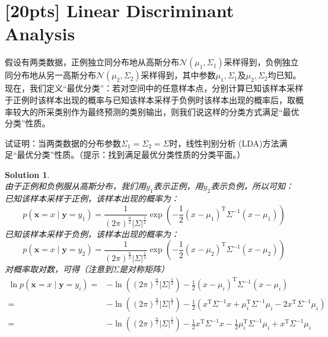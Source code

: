 \documentclass[a4paper,UTF8]{article}
\numberwithin{equation}{section}
\newtheorem*{solution}{Solution}
\begin{document}
\section{[20pts] Linear Discriminant Analysis}
假设有两类数据，正例独立同分布地从高斯分布$\mathcal{N}(\mu_1,\Sigma_1)$采样得到，负例独立同分布地从另一高斯分布$\mathcal{N}(\mu_2,\Sigma_2)$采样得到，其中参数$\mu_1,\Sigma_1$及$\mu_2,\Sigma_2$均已知。现在，我们定义“最优分类”：若对空间中的任意样本点，分别计算已知该样本采样于正例时该样本出现的概率与已知该样本采样于负例时该样本出现的概率后，取概率较大的所采类别作为最终预测的类别输出，则我们说这样的分类方式满足“最优分类”性质。

试证明：当两类数据的分布参数$\Sigma_1=\Sigma_2=\Sigma$时，线性判别分析 (LDA)方法满足“最优分类”性质。（提示：找到满足最优分类性质的分类平面。）
\begin{solution}
~\\
由于正例和负例服从高斯分布，我们用$y_1$表示正例，用$y_2$表示负例，所以可知：\\
已知该样本采样于正例，该样本出现的概率为：\\
\begin{equation}
p(\mathbf{x} = x \mid \mathbf{y} = y_1) = \frac{1}{(2\pi)^{\frac{n}{2}}\lvert \Sigma \rvert^{\frac{1}{2}}}\exp(-\frac{1}{2}(x - \mu_1)^\mathrm{T}\Sigma^{-1}(x - \mu_1)
)
\end{equation}
已知该样本采样于负例，该样本出现的概率为：\\
\begin{equation}
p(\mathbf{x} = x \mid \mathbf{y} = y_2) = \frac{1}{(2\pi)^{\frac{n}{2}}\lvert \Sigma \rvert^{\frac{1}{2}}}\exp(-\frac{1}{2}(x - \mu_2)^\mathrm{T}\Sigma^{-1}(x - \mu_2)
)
\end{equation}
对概率取对数，可得（注意到$\Sigma$是对称矩阵）
\begin{equation}
\begin{aligned}
\ln p(\mathbf{x} = x \mid \mathbf{y} = y_i) 
=&- \ln((2\pi)^{\frac{n}{2}}\lvert \Sigma \rvert^{\frac{1}{2}}) - \frac{1}{2}(x - \mu_i)^\mathrm{T}\Sigma^{-1}(x - \mu_i)\\
=&- \ln((2\pi)^{\frac{n}{2}}\lvert \Sigma \rvert^{\frac{1}{2}}) - \frac{1}{2}(x^\mathrm{T}\Sigma^{-1}x + \mu_i^\mathrm{T}\Sigma^{-1}\mu_i - 2x^{\mathrm{T}}\Sigma^{-1}\mu_i)\\
=&- \ln((2\pi)^{\frac{n}{2}}\lvert \Sigma \rvert^{\frac{1}{2}}) - \frac{1}{2}x^\mathrm{T}\Sigma^{-1}x - \frac{1}{2} \mu_i^\mathrm{T}\Sigma^{-1}\mu_i + x^{\mathrm{T}}\Sigma^{-1}\mu_i
\end{aligned}
\end{equation}

\end{solution}
\end{document}
